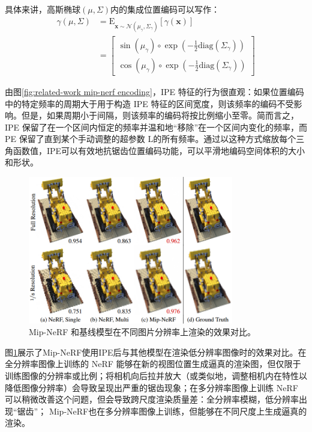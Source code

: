 具体来讲，高斯椭球$(\mu,\Sigma)$内的集成位置编码可以写作：
\begin{align}
    \gamma(\mu,\Sigma) &= \text{E}_{\mathbf{x}\sim\mathcal{N}(\mu_\gamma,\Sigma_\gamma)}[\gamma(\mathbf{x})] \\
    &= \begin{bmatrix}
    \sin(\mu_\gamma)\circ\exp(-\frac{1}{2}\text{diag}(\Sigma_\gamma))\\
    \cos(\mu_\gamma)\circ\exp(-\frac{1}{2}\text{diag}(\Sigma_\gamma))
    \end{bmatrix}
\end{align}

由图\ref{fig:related-work mip-nerf encoding}，IPE 特征的行为很直观：如果位置编码中的特定频率的周期大于用于构造 IPE 特征的区间宽度，则该频率的编码不受影响。但是，如果周期小于间隔，则该频率的编码将按比例缩小至零。简而言之，IPE 保留了在一个区间内恒定的频率并温和地“移除”在一个区间内变化的频率，而 PE 保留了直到某个手动调整的超参数 L的所有频率。通过以这种方式缩放每个三角函数值，IPE可以有效地抗锯齿位置编码功能，可以平滑地编码空间体积的大小和形状。

\begin{figure}[ht]
    \centering
    \includegraphics[width=0.8\textwidth]{undergraduate-thesis/images/related-work/mipnerf-multi-scale.png}
    \caption{Mip-NeRF\cite{barron_mip-nerf_2021} 和基线模型在不同图片分辨率上渲染的效果对比。}
    \label{fig:related-work mip-nerf results}
\end{figure}

图\ref{fig:related-work mip-nerf results}展示了Mip-NeRF使用IPE后与其他模型在渲染低分辨率图像时的效果对比。在全分辨率图像上训练的 NeRF 能够在新的视图位置生成逼真的渲染图，但仅限于训练图像的分辨率或比例；将相机向后拉并放大（或类似地，调整相机内在特性以降低图像分辨率）会导致呈现出严重的锯齿现象；在多分辨率图像上训练 NeRF 可以稍微改善这个问题，但会导致跨尺度渲染质量差：全分辨率模糊，低分辨率出现“锯齿”； Mip-NeRF也在多分辨率图像上训练，但能够在不同尺度上生成逼真的渲染。

